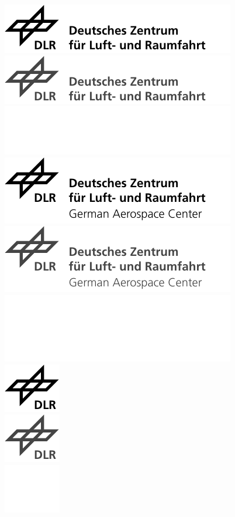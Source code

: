 \documentclass{report}
\begin{document}
\includegraphics{dlrlogo}\\
\includegraphics{dlrlogog}\\
\includegraphics{dlrlogoi}\\
\includegraphics{dlrlogo_en}\\
\includegraphics{dlrlogog_en}\\
\includegraphics{dlrlogoi_en}\\
\includegraphics{dlradler}\\
\includegraphics{dlradlerg}\\
\includegraphics{dlradleri}\\
\end{document}
